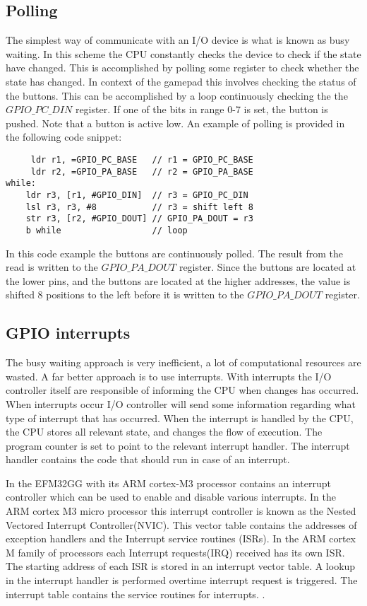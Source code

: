 \subsection{Polling}\label{ch:polling}
The simplest way of communicate with an I/O device is what is known as busy waiting\cite[p. ]{wolf}. In this scheme the CPU constantly checks the device to check if the state have changed. This is accomplished by polling some register to check whether the state has changed. In context of the gamepad this involves checking the status of the buttons. This can be accomplished by a loop continuously checking the  
the $GPIO\_PC\_DIN$ register. If one of the bits in range 0-7 is set, the button is pushed. Note that a button is active low. An example of polling is provided in the following code snippet:

\begin{lstlisting}
     ldr r1, =GPIO_PC_BASE   // r1 = GPIO_PC_BASE
     ldr r2, =GPIO_PA_BASE   // r2 = GPIO_PA_BASE
while:
    ldr r3, [r1, #GPIO_DIN]  // r3 = GPIO_PC_DIN
    lsl r3, r3, #8           // r3 = shift left 8  
    str r3, [r2, #GPIO_DOUT] // GPIO_PA_DOUT = r3
    b while                  // loop
\end{lstlisting}

In this code example the buttons are continuously polled. The result from the read is written to the $GPIO\_PA\_DOUT$ register. Since the buttons are located at the lower pins, and the buttons are located at the higher addresses, the value is shifted 8 positions to the left before it is written to the $GPIO\_PA\_DOUT$ register. 


\subsection{GPIO interrupts}\label{ch:interrupts}
The busy waiting approach is very inefficient, a lot of computational resources are wasted. A far better approach is to use interrupts. With interrupts the I/O controller itself are responsible of informing the CPU when changes has occurred. When interrupts occur I/O controller will send some information regarding what type of interrupt that has occurred. When the interrupt is handled by the CPU, the CPU stores all relevant state, and changes the flow of execution. The program counter is set to point to the relevant interrupt handler.  The interrupt handler contains the code that should run in case of an interrupt. 


In the EFM32GG with its ARM cortex-M3 processor contains an interrupt controller which can be used to enable and disable various interrupts. In the ARM cortex M3 micro processor this interrupt controller is known as the Nested Vectored Interrupt Controller(NVIC). This vector table contains the addresses of exception handlers and the Interrupt service routines (ISRs). In the ARM cortex M family of processors each Interrupt requests(IRQ) received has its own ISR. The starting address of each ISR is stored in an interrupt vector table. A lookup in the interrupt handler is performed overtime interrupt request is triggered. The interrupt table contains the service routines for interrupts. \cite{EFM32-int}. 

